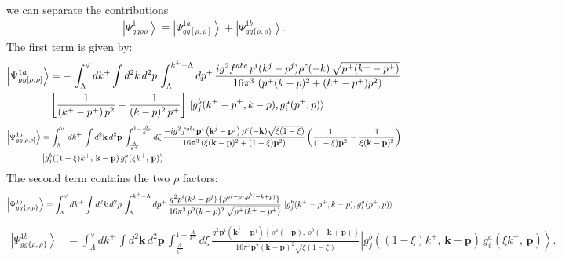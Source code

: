 \documentclass[aps,prd,amsmath,amssymb,nofootinbib]{revtex4-2}
\numberwithin{equation}{section}
\begin{document}
we can separate the contributions
\begin{align}
\left|\Psi_{gg\rho\rho}^{1}\right\rangle \equiv \left|\Psi_{gg[\rho,\rho]}^{1a}\right\rangle + \left|\Psi_{gg\{\rho,\rho\}}^{1b}\right\rangle.
\end{align}
The first term is given by:
\begin{align}
    \left|\Psi_{gg[\rho,\rho]}^{1a}\right\rangle &= -\,\int_{\Lambda}^{\vee} dk^{+} \int d^{2}k\, d^{2}p\, \int_{\Lambda}^{k^{+}-\Lambda}dp^{+}\, \frac{ig^{2}f^{abc}\,p^{i}(k^{j}-p^{j})\rho^{c}(-k)\, \sqrt{p^{+}(k^{+}-p^{+})}}{16\pi^{3}\, \left(p^{+}(k-p)^{2}+(k^{+}-p^{+})p^{2}\right)}\notag \\ &  \left[\frac{1}{(k^{+}-p^{+})\,p^{2}} - \frac{1}{(k-p)^{2}\,p^{+}}\right]\, \ket{g^{b}_{j}(k^{+}-p^{+}, k-p),g^{a}_{i}(p^{+},p)}
\end{align}
\begin{align}\label{part 1}
\left|\Psi_{gg[\rho,\rho]}^{1a}\right\rangle &=\int_{\Lambda}^{\vee}\, dk^{+}\,\int d^{2}\mathbf{k}\, d^{2}\mathbf{p}\,\int_{\frac{\Lambda}{k^{+}}}^{1-\frac{\Lambda}{k^{+}}}d\xi\,\frac{-ig^{2}f^{abc}\mathbf{p}^{i}\left(\mathbf{k}^{j}-\mathbf{p}^{j}\right)\rho^{c}(-\mathbf{k})\sqrt{\xi(1-\xi)}}{16\pi^{3}\left(\xi(\mathbf{k}-\mathbf{p})^{2}+(1-\xi)\mathbf{p}^{2}\right)} \left(\frac{1}{(1-\xi)\mathbf{p}^{2}}-\frac{1}{\xi(\mathbf{k}-\mathbf{p})^{2}}\right)\notag \\ & \left|g_{j}^{b}((1-\xi)k^{+},\,\mathbf{k}-\mathbf{p})\,g_{i}^{a}(\xi k^{+},\,\mathbf{p})\right\rangle.
\end{align}
The second term contains the two $\rho$ factors:
\begin{align}
    \left|\Psi_{gg\{\rho,\rho\}}^{1b}\right\rangle & =  \int_{\Lambda}^{\vee} dk^{+} \int d^{2}k\, d^{2}p\, \int_{\Lambda}^{k^{+}-\Lambda}dp^{+}\, \frac{g^{2}p^{i}(k^{j}-p^{j})\,\{\rho^{a(-p),\rho^{b}(-k+p)}\}}{16\pi^{3}\,p^{2}(k-p)^{2}\, \sqrt{p^{+}(k^{+}-p^{+})}}\, \ket{g^{b}_{j}(k^{+}-p^{+}, k-p),g^{a}_{i}(p^{+},p)}
\end{align}
\begin{align}\label{part 2}
\left|\Psi_{gg\{\rho,\rho\}}^{1b}\right\rangle &= \int_{\Lambda}^{\vee}dk^{+}\,\int d^{2}\mathbf{k}\, d^{2}\mathbf{p}\,\int_{\frac{\Lambda}{k^{+}}}^{1-\frac{\Lambda}{k^{+}}}d\xi\,\frac{g^{2}\mathbf{p}^{i}\left(\mathbf{k}^{j}-\mathbf{p}^{j}\right)\left\{ \rho^{a}(-\mathbf{p}),\,\rho^{b}(-\mathbf{k}+\mathbf{p})\right\} }{16\pi^{3}\mathbf{p}^{2}(\mathbf{k}-\mathbf{p})^{2}\sqrt{\xi(1-\xi)}}  \left|g_{j}^{b}((1-\xi)k^{+},\,\mathbf{k}-\mathbf{p})\,g_{i}^{a}(\xi k^{+},\,\mathbf{p})\right\rangle.
\end{align}
\end{document}
